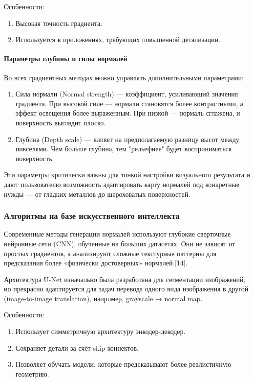 Особенности:
\begin{enumerate}
	\item Высокая точность градиента.
	\item Используется в приложениях, требующих повышенной детализации.
\end{enumerate}
\paragraph{Параметры глубины и силы нормалей}

Во всех градиентных методах можно управлять дополнительными параметрами:
\begin{enumerate}
	\item Сила нормали (Normal strength) — коэффициент, усиливающий значения градиента. При высокой силе — нормали становятся более контрастными, а эффект освещения более выраженным. При низкой — нормаль сглажена, и поверхность выглядит плоско.
	\item Глубина (Depth scale) — влияет на предполагаемую разницу высот между пикселями. Чем больше глубина, тем "рельефнее" будет восприниматься поверхность.
\end{enumerate}

Эти параметры критически важны для тонкой настройки визуального результата и дают пользователю возможность адаптировать карту нормалей под конкретные нужды — от гладких металлов до шероховатых поверхностей.

\subsubsection{Алгоритмы на базе искусственного интеллекта}

Современные методы генерации нормалей используют глубокие сверточные нейронные сети (CNN), обученные на больших датасетах. Они не зависят от простых градиентов, а анализируют сложные текстурные паттерны для предсказания более «физически достоверных» нормалей [14].

Архитектура U-Net изначально была разработана для сегментации изображений, но прекрасно адаптируется для задач перевода одного вида изображения в другой (image-to-image translation), например, grayscale → normal map.

Особенности:
\begin{enumerate}
	\item Использует симметричную архитектуру энкодер-декодер.
	\item Сохраняет детали за счёт skip-коннектов.
	\item Позволяет обучать модели, которые предсказывают более реалистичную геометрию.
\end{enumerate}

